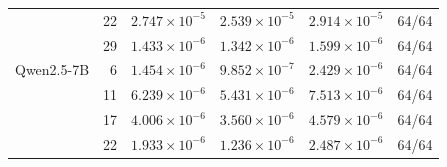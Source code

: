 \begin{tabular}{@{}lrrrrr@{}}
 & 22 & $2.747\times10^{-5}$ & $2.539\times10^{-5}$ & $2.914\times10^{-5}$ & 64/64 \\
 & 29 & $1.433\times10^{-6}$ & $1.342\times10^{-6}$ & $1.599\times10^{-6}$ & 64/64 \\
\addlinespace[2pt]
Qwen2.5-7B & 6 & $1.454\times10^{-6}$ & $9.852\times10^{-7}$ & $2.429\times10^{-6}$ & 64/64 \\
 & 11 & $6.239\times10^{-6}$ & $5.431\times10^{-6}$ & $7.513\times10^{-6}$ & 64/64 \\
 & 17 & $4.006\times10^{-6}$ & $3.560\times10^{-6}$ & $4.579\times10^{-6}$ & 64/64 \\
 & 22 & $1.933\times10^{-6}$ & $1.236\times10^{-6}$ & $2.487\times10^{-6}$ & 64/64 \\
\bottomrule
\end{tabular}
